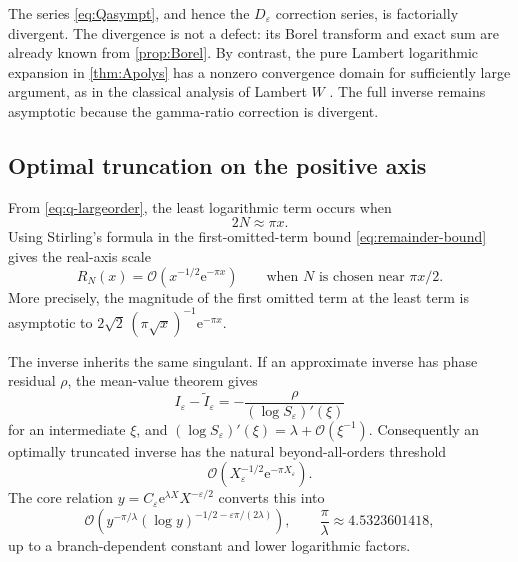\documentclass[11pt]{article}
\theoremstyle{definition}
\theoremstyle{remark}
\newcommand{\eps}{\varepsilon}
\newcommand{\lam}{\lambda}
\newcommand{\e}{\mathrm e}
\newcommand{\bigO}{\mathcal O}
\begin{document}
The series \eqref{eq:Qasympt}, and hence the $D_\eps$ correction series, is factorially divergent.  The divergence is not a defect: its Borel transform and exact sum are already known from \cref{prop:Borel}.  By contrast, the pure Lambert logarithmic expansion in \cref{thm:Apolys} has a nonzero convergence domain for sufficiently large argument, as in the classical analysis of Lambert $W$ \cite{Corless1996,DLMFW}.  The full inverse remains asymptotic because the gamma-ratio correction is divergent.

\subsection{Optimal truncation on the positive axis}

From \eqref{eq:q-largeorder}, the least logarithmic term occurs when
\begin{equation}\label{eq:optimal-N}
 2N\approx\pi x.
\end{equation}
Using Stirling's formula in the first-omitted-term bound \eqref{eq:remainder-bound} gives the real-axis scale
\begin{equation}\label{eq:Q-optimal}
 R_N(x)=\bigO\!\left(x^{-1/2}\e^{-\pi x}\right)
 \qquad\text{when }N\text{ is chosen near }\pi x/2.
\end{equation}
More precisely, the magnitude of the first omitted term at the least term is asymptotic to
$2\sqrt2\,(\pi\sqrt x)^{-1}\e^{-\pi x}$.

The inverse inherits the same singulant.  If an approximate inverse has phase residual $\rho$, the mean-value theorem gives
\begin{equation}\label{eq:residual-to-error}
 I_\eps-\widetilde I_\eps
 =-\frac{\rho}{(\log S_\eps)'(\xi)}
\end{equation}
for an intermediate $\xi$, and $(\log S_\eps)'(\xi)=\lam+\bigO(\xi^{-1})$.  Consequently an optimally truncated inverse has the natural beyond-all-orders threshold
\begin{equation}\label{eq:inverse-optimal-X}
 \bigO\!\left(X_\eps^{-1/2}\e^{-\pi X_\eps}\right).
\end{equation}
The core relation $y=C_\eps\e^{\lam X}X^{-\eps/2}$ converts this into
\begin{equation}\label{eq:inverse-optimal-y}
 \bigO\!\left(
 y^{-\pi/\lam}
 (\log y)^{-1/2-\eps\pi/(2\lam)}
 \right),
 \qquad \frac\pi\lam\approx4.5323601418,
\end{equation}
up to a branch-dependent constant and lower logarithmic factors.
\end{document}
